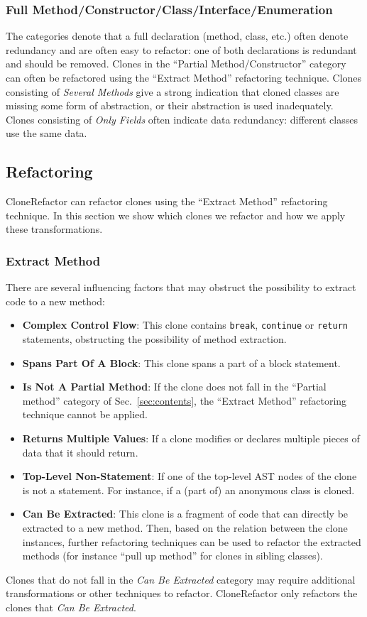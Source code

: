 \documentclass[sigconf,review]{acmart}
\begin{document}
\subsubsection{Full Method/Constructor/Class/Interface/Enumeration}
The categories denote that a full declaration (method, class, etc.) often denote redundancy and are often easy to refactor: one of both declarations is redundant and should be removed. Clones in the ``Partial Method/Constructor'' category can often be refactored using the ``Extract Method'' refactoring technique. Clones consisting of \textit{Several Methods} give a strong indication that cloned classes are missing some form of abstraction, or their abstraction is used inadequately. Clones consisting of \textit{Only Fields} often indicate data redundancy: different classes use the same data.

\subsection{Refactoring}
CloneRefactor can refactor clones using the ``Extract Method'' refactoring technique. In this section we show which clones we refactor and how we apply these transformations.

\subsubsection{Extract Method}
There are several influencing factors that may obstruct the possibility to extract code to a new method:
\begin{itemize}
    \item \textbf{Complex Control Flow}: This clone contains \texttt{break}, \texttt{continue} or \texttt{return} statements, obstructing the possibility of method extraction.
    \item \textbf{Spans Part Of A Block}: This clone spans a part of a block statement.
    \item \textbf{Is Not A Partial Method}: If the clone does not fall in the ``Partial method'' category of Sec.~\ref{sec:contents}, the ``Extract Method'' refactoring technique cannot be applied.
    \item \textbf{Returns Multiple Values}: If a clone modifies or declares multiple pieces of data that it should return.
    \item \textbf{Top-Level Non-Statement}: If one of the top-level AST nodes of the clone is not a statement. For instance, if a (part of) an anonymous class is cloned.
    \item \textbf{Can Be Extracted}: This clone is a fragment of code that can directly be extracted to a new method. Then, based on the relation between the clone instances, further refactoring techniques can be used to refactor the extracted methods (for instance ``pull up method'' for clones in sibling classes).
\end{itemize}
Clones that do not fall in the \textit{Can Be Extracted} category may require additional transformations or other techniques to refactor. CloneRefactor only refactors the clones that \textit{Can Be Extracted}.
\end{document}

